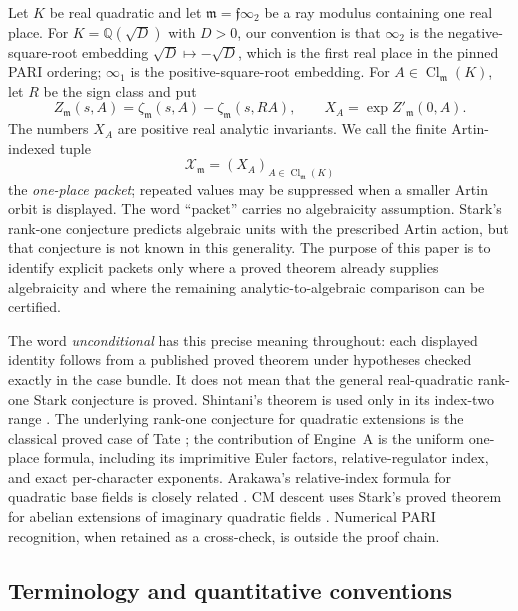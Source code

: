 \documentclass[11pt]{article}
\newcommand{\Q}{\mathbb Q}
\newcommand{\Cl}{\operatorname{Cl}}
\begin{document}
Let $K$ be real quadratic and let
\(\mathfrak m=\mathfrak f\infty_2\) be a ray modulus containing one
real place.  For \(K=\Q(\sqrt D)\) with \(D>0\), our convention is
that \(\infty_2\) is the negative-square-root embedding
\(\sqrt D\mapsto-\sqrt D\), which is the first real place in the
pinned PARI ordering; \(\infty_1\) is the positive-square-root
embedding.  For \(A\in\Cl_{\mathfrak m}(K)\), let \(R\) be the sign
class and put
\begin{equation}\label{eq:def-zx}
 Z_{\mathfrak m}(s,A)
 =\zeta_{\mathfrak m}(s,A)
  -\zeta_{\mathfrak m}(s,RA),\qquad
 X_A=\exp Z'_{\mathfrak m}(0,A).
\end{equation}
The numbers \(X_A\) are positive real analytic invariants.  We call
the finite Artin-indexed tuple
\[
 \mathcal X_{\mathfrak m}=(X_A)_{A\in\Cl_{\mathfrak m}(K)}
\]
the \emph{one-place packet}; repeated values may be suppressed when a
smaller Artin orbit is displayed.  The word ``packet'' carries no
algebraicity assumption.  Stark's rank-one conjecture predicts
algebraic units with the prescribed Artin action, but that conjecture
is not known in this generality.  The purpose of this paper is to
identify explicit packets only where a proved theorem already supplies
algebraicity and where the remaining analytic-to-algebraic comparison
can be certified.

The word \emph{unconditional} has this precise meaning throughout:
each displayed identity follows from a published proved theorem under
hypotheses checked exactly in the case bundle.  It does not mean that
the general real-quadratic rank-one Stark conjecture is proved.
Shintani's theorem is used only in its index-two range
\cite{Shintani1978}.  The underlying rank-one conjecture for
quadratic extensions is the classical proved case of
Tate \cite[Thm.~IV.5.4]{Tate1984}; the contribution of Engine~A is
the uniform one-place formula, including its imprimitive Euler
factors, relative-regulator index, and exact per-character
exponents.  Arakawa's relative-index formula for quadratic base
fields is closely related \cite{Arakawa1985}.  CM descent uses
Stark's proved theorem for abelian extensions of imaginary quadratic fields
\cite{Stark1980}. Numerical PARI recognition, when retained as a
cross-check, is outside the proof chain.

\subsection*{Terminology and quantitative conventions}
\end{document}
